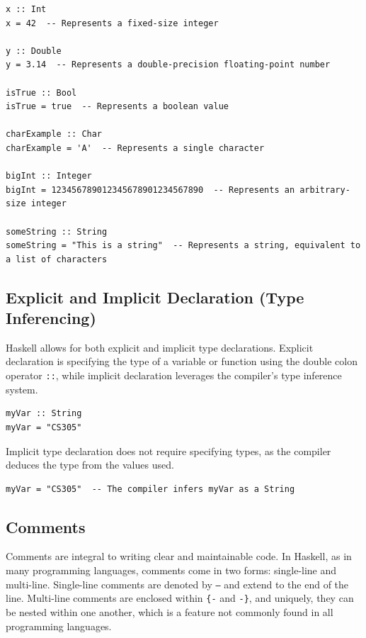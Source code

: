 \documentclass[a4paper, 10pt]{article}
\begin{document}
            \begin{lstlisting}
x :: Int
x = 42  -- Represents a fixed-size integer

y :: Double
y = 3.14  -- Represents a double-precision floating-point number

isTrue :: Bool
isTrue = true  -- Represents a boolean value

charExample :: Char
charExample = 'A'  -- Represents a single character

bigInt :: Integer
bigInt = 123456789012345678901234567890  -- Represents an arbitrary-size integer

someString :: String
someString = "This is a string"  -- Represents a string, equivalent to a list of characters
            \end{lstlisting}


        \subsection{Explicit and Implicit Declaration (Type Inferencing)}
            Haskell allows for both explicit and implicit type declarations. Explicit declaration is specifying the type of a variable or function using the double colon operator \texttt{::}, while implicit declaration leverages the compiler's type inference system.

            \begin{lstlisting}
myVar :: String
myVar = "CS305"
            \end{lstlisting}

            Implicit type declaration does not require specifying types, as the compiler deduces the type from the values used.

            \begin{lstlisting}
myVar = "CS305"  -- The compiler infers myVar as a String
            \end{lstlisting}

        \subsection{Comments}
            Comments are integral to writing clear and maintainable code. In Haskell, as in many programming languages, comments come in two forms: single-line and multi-line. Single-line comments are denoted by \texttt{--} and extend to the end of the line. Multi-line comments are enclosed within \texttt{\{-} and \texttt{-\}}, and uniquely, they can be nested within one another, which is a feature not commonly found in all programming languages.
\end{document}
